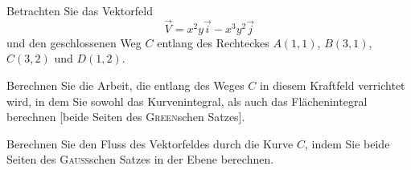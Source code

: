 \begin{atiTask}[
  title = Zweidimensionales Vektorfeld
]
Betrachten Sie das Vektorfeld
\[
\vec{V}=x^2y\vec{i}-x^3y^2\vec{j}\]
und den geschlossenen Weg $C$ entlang des Rechteckes $A(1,1)$, $B(3,1)$, $C(3,2)$ und $D(1,2)$.
\begin{atiSubtasks}
\item Berechnen Sie die Arbeit, die entlang des Weges $C$ in diesem Kraftfeld verrichtet wird, in dem Sie sowohl das Kurvenintegral, als auch das Flächenintegral berechnen [beide Seiten des \textsc{Green}schen Satzes].
\item Berechnen Sie den Fluss des Vektorfeldes durch die Kurve $C$, indem Sie beide Seiten des \textsc{Gauß}schen Satzes in der Ebene berechnen.
\end{atiSubtasks}
\end{atiTask}
\begin{atiSolution}

\end{atiSolution}